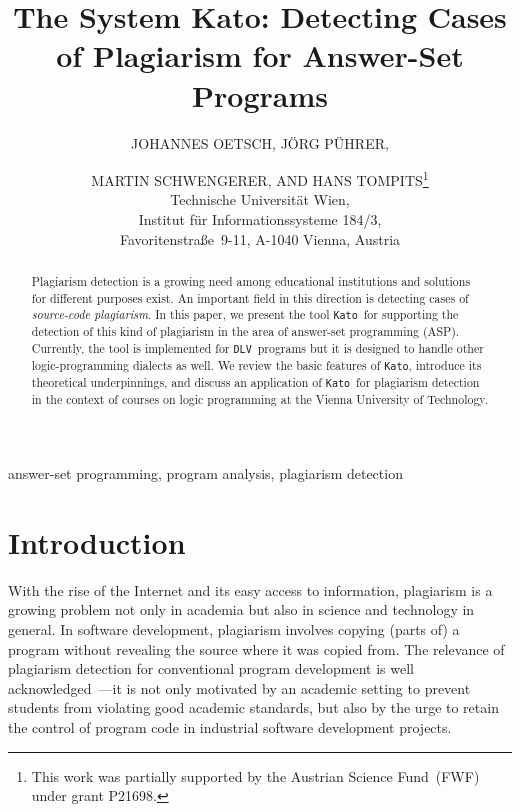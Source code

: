 \documentclass{tlp}
\newcommand{\dlv}{\texttt{DLV}\xspace}
\newcommand{\kato}[0]{\texttt{Kato}\xspace}
\begin{document}
\label{firstpage}


\title[The System Kato: Detecting Cases of Plagiarism for Answer-Set Programs]{The System Kato: Detecting Cases of Plagiarism for Answer-Set Programs}

\author[J. Oetsch, J. P{\"u}hrer, M. Schwengerer,  and H. Tompits]
{JOHANNES OETSCH, J{\"O}RG P{\"U}HRER,\and MARTIN SCHWENGERER, AND
HANS TOMPITS\thanks{This work was partially supported by the Austrian Science Fund~(FWF) under grant P21698.}\\
Technische Universit\"at Wien,\\
Institut f\"ur Informationssysteme 184/3,\\
Favoritenstra\ss{}e\ 9-11,
A-1040 Vienna, Austria \\
}


\maketitle
                                              
\begin{abstract}
Plagiarism detection is a growing need among educational institutions and solutions for different purposes exist.
An important field in this direction is detecting cases of \emph{source-code plagiarism}. 
In this paper, we present the tool \kato\ for supporting the detection of this kind of plagiarism in the area of answer-set programming (ASP).
Currently, the tool is implemented for \dlv\ programs but it is designed to handle other logic-programming dialects as well. We 
review the basic features of \kato, 
introduce its theoretical underpinnings,  and discuss an application  of \kato\ for plagiarism detection 
in the context of   courses on logic programming at the Vienna University of Technology.
\end{abstract}
\begin{keywords}
answer-set programming, program analysis, plagiarism detection
\end{keywords}


\section{Introduction}\label{sec:intro}


With the rise of the Internet and its easy access to information, plagiarism is a growing problem not only in academia but also in science and technology in general.
In software development, plagiarism involves copying (parts of) a program
without revealing the source
where it was copied from. The relevance of plagiarism detection for conventional 
program development is well acknowledged~\cite{clough00}---it is not only motivated by an
academic setting to prevent students from violating good academic standards, but
also by the urge to retain the control of program code in industrial software development 
projects.
\end{document}
